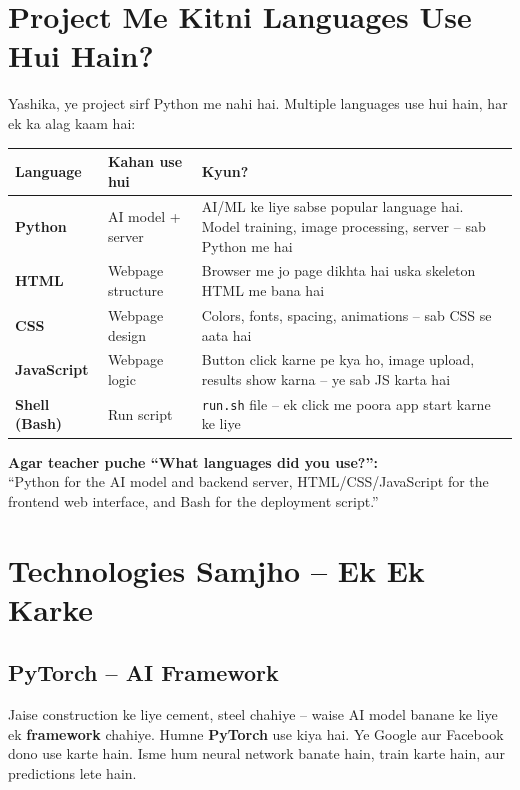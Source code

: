 \documentclass[11pt,a4paper]{article}
\begin{document}
\section{Project Me Kitni Languages Use Hui Hain?}

Yashika, ye project sirf Python me nahi hai. Multiple languages use hui hain, har ek ka alag kaam hai:

\begin{tabularx}{\textwidth}{l l X}
\toprule
\textbf{Language} & \textbf{Kahan use hui} & \textbf{Kyun?} \\
\midrule
\textbf{Python} & AI model + server & AI/ML ke liye sabse popular language hai. Model training, image processing, server -- sab Python me hai \\
\textbf{HTML} & Webpage structure & Browser me jo page dikhta hai uska skeleton HTML me bana hai \\
\textbf{CSS} & Webpage design & Colors, fonts, spacing, animations -- sab CSS se aata hai \\
\textbf{JavaScript} & Webpage logic & Button click karne pe kya ho, image upload, results show karna -- ye sab JS karta hai \\
\textbf{Shell (Bash)} & Run script & \texttt{run.sh} file -- ek click me poora app start karne ke liye \\
\bottomrule
\end{tabularx}

\vspace{0.3cm}

\begin{tipbox}
\textbf{Agar teacher puche ``What languages did you use?'':}\\[0.2cm]
``Python for the AI model and backend server, HTML/CSS/JavaScript for the frontend web interface, and Bash for the deployment script.''
\end{tipbox}

\section{Technologies Samjho -- Ek Ek Karke}

\subsection{PyTorch -- AI Framework}
Jaise construction ke liye cement, steel chahiye -- waise AI model banane ke liye ek \textbf{framework} chahiye. Humne \textbf{PyTorch} use kiya hai. Ye Google aur Facebook dono use karte hain. Isme hum neural network banate hain, train karte hain, aur predictions lete hain.
\end{document}
